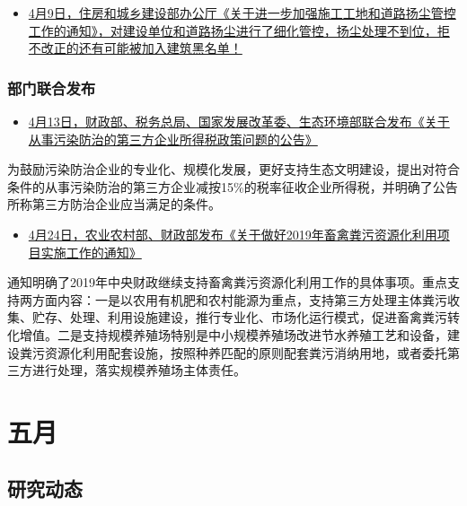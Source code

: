 \documentclass[
]{book}
\providecommand{\tightlist}{%
  \setlength{\itemsep}{0pt}\setlength{\parskip}{0pt}}
\begin{document}
\begin{itemize}
\tightlist
\item
  \href{http://www.mohurd.gov.cn/wjfb/201904/t20190415_240200.html}{4月9日，住房和城乡建设部办公厅《关于进一步加强施工工地和道路扬尘管控工作的通知》，对建设单位和道路扬尘进行了细化管控，扬尘处理不到位，拒不改正的还有可能被加入建筑黑名单！}
\end{itemize}

\hypertarget{ux90e8ux95e8ux8054ux5408ux53d1ux5e03-5}{%
\subsubsection*{部门联合发布}\label{ux90e8ux95e8ux8054ux5408ux53d1ux5e03-5}}

\begin{itemize}
\tightlist
\item
  \href{http://szs.mof.gov.cn/zhengwuxinxi/zhengcefabu/201904/t20190425_3234504.html}{4月13日，财政部、税务总局、国家发展改革委、生态环境部联合发布《关于从事污染防治的第三方企业所得税政策问题的公告》}
\end{itemize}

为鼓励污染防治企业的专业化、规模化发展，更好支持生态文明建设，提出对符合条件的从事污染防治的第三方企业减按15\%的税率征收企业所得税，并明确了公告所称第三方防治企业应当满足的条件。

\begin{itemize}
\tightlist
\item
  \href{http://www.moa.gov.cn/govpublic/SYJ/201904/t20190426_6212935.htm}{4月24日，农业农村部、财政部发布《关于做好2019年畜禽粪污资源化利用项目实施工作的通知》}
\end{itemize}

通知明确了2019年中央财政继续支持畜禽粪污资源化利用工作的具体事项。重点支持两方面内容：一是以农用有机肥和农村能源为重点，支持第三方处理主体粪污收集、贮存、处理、利用设施建设，推行专业化、市场化运行模式，促进畜禽粪污转化增值。二是支持规模养殖场特别是中小规模养殖场改进节水养殖工艺和设备，建设粪污资源化利用配套设施，按照种养匹配的原则配套粪污消纳用地，或者委托第三方进行处理，落实规模养殖场主体责任。

\hypertarget{ux4e94ux6708-1}{%
\section*{五月}\label{ux4e94ux6708-1}}

\hypertarget{ux7814ux7a76ux52a8ux6001-18}{%
\subsection*{研究动态}\label{ux7814ux7a76ux52a8ux6001-18}}
\end{document}
